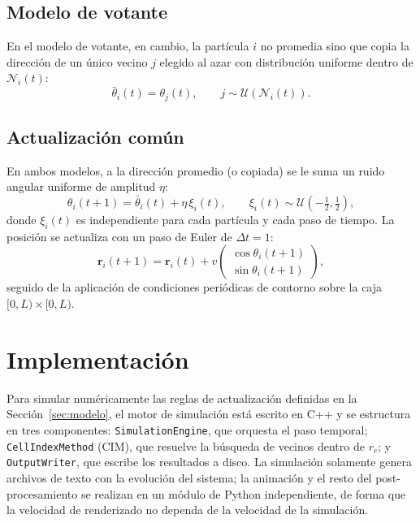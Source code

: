 \documentclass[11pt,a4paper]{article}
\newcommand{\rmed}{\mathbf{r}}
\begin{document}
\subsection{Modelo de votante}

En el modelo de votante, en cambio, la partícula $i$ no promedia sino que
copia la dirección de un único vecino $j$ elegido al azar con distribución
uniforme dentro de $\mathcal{N}_i(t)$:
\begin{equation}
  \bar\theta_i(t) = \theta_j(t), \qquad j \sim \mathcal{U}(\mathcal{N}_i(t)).
  \label{eq:voter}
\end{equation}

\subsection{Actualización común}

En ambos modelos, a la dirección promedio (o copiada) se le suma un ruido
angular uniforme de amplitud $\eta$:
\begin{equation}
  \theta_i(t+1) = \bar\theta_i(t) + \eta\,\xi_i(t), \qquad
  \xi_i(t) \sim \mathcal{U}\!\left(-\tfrac{1}{2}, \tfrac{1}{2}\right),
  \label{eq:ruido}
\end{equation}
donde $\xi_i(t)$ es independiente para cada partícula y cada paso de tiempo.
La posición se actualiza con un paso de Euler de $\Delta t = 1$:
\begin{equation}
  \rmed_i(t+1) = \rmed_i(t) + v \begin{pmatrix} \cos\theta_i(t+1) \\ \sin\theta_i(t+1) \end{pmatrix},
  \label{eq:posicion}
\end{equation}
seguido de la aplicación de condiciones periódicas de contorno sobre la caja
$[0,L)\times[0,L)$.

\section{Implementación}
\label{sec:implementacion}

Para simular numéricamente las reglas de actualización definidas en la
Sección~\ref{sec:modelo}, el motor de simulación está escrito en C++ y se
estructura en tres componentes: \texttt{SimulationEngine}, que orquesta el
paso temporal; \texttt{CellIndexMethod} (CIM), que resuelve la
búsqueda de vecinos dentro de $r_c$; y \texttt{OutputWriter}, que escribe
los resultados a disco. La simulación solamente genera archivos de texto
con la evolución del sistema; la animación y el resto del
post-procesamiento se realizan en un módulo de Python independiente, de
forma que la velocidad de renderizado no dependa de la velocidad de la
simulación.
\end{document}
